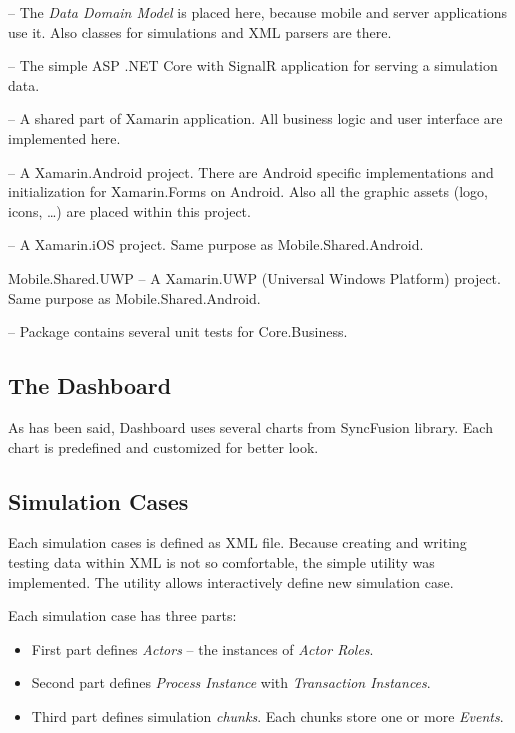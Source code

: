 \begin{description}
\item[Core.Business] -- The \textit{Data Domain Model} is placed here, because mobile and server applications use it. Also classes for simulations and XML parsers are there.
\item[Server] -- The simple ASP .NET Core with SignalR application for serving a simulation data.
\item[Mobile.Shared] -- A shared part of Xamarin application. All business logic and user interface are implemented here.
\item[Mobile.Shared.Android] -- A Xamarin.Android project. There are Android specific implementations and initialization for Xamarin.Forms on Android. Also all the graphic assets (logo, icons, \dots) are placed within this project.
\item[Mobile.Shared.iOS] -- A Xamarin.iOS project. Same purpose as Mobile.Shared.Android.
\item{Mobile.Shared.UWP} -- A Xamarin.UWP (Universal Windows Platform) project. Same purpose as Mobile.Shared.Android.
\item[Tests] -- Package contains several unit tests for Core.Business. 
\end{description}
\subsection{The Dashboard}
As has been said, Dashboard uses several charts from SyncFusion library. Each chart is predefined and customized for better look. 
\subsection{Simulation Cases}
Each simulation cases is defined as XML file. Because creating and writing testing data within XML is not so comfortable, the simple utility was implemented. The utility allows interactively define new simulation case.

Each simulation case has three parts:
\begin{itemize}
\item First part defines \textit{Actors} -- the instances of \textit{Actor Roles}.
\item Second part defines \textit{Process Instance} with \textit{Transaction Instances}.
\item Third part defines simulation \textit{chunks}. Each chunks store one or more \textit{Events}.
\end{itemize}

